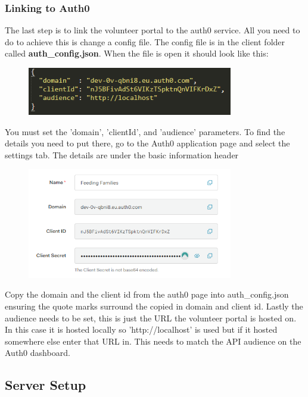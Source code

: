 \documentclass[12pt]{article}
\begin{document}
\subsubsection{Linking to Auth0}
The last step is to link the volunteer portal to the auth0 service. All you need to do to achieve this is change a config file. The config file is in the client folder called \textbf{auth\_config.json}. When the file is open it should look like this: 
\begin{figure}[H]
    \centering
    \includegraphics[width=0.8\textwidth]{auth0/config.png}
\end{figure}
\noindent
You must set the 'domain', 'clientId', and 'audience' parameters. To find the details you need to put there, go to the Auth0 application page and select the settings tab. The details are under the basic information header
\begin{figure}[H]
    \centering
    \includegraphics[width=0.8\textwidth]{auth0/configsettings.png}
\end{figure}
\noindent
Copy the domain and the client id from the auth0 page into auth\_config.json ensuring the quote marks surround the copied in domain and client id. Lastly the audience needs to be set, this is just the URL the volunteer portal is hosted on. In this case it is hosted locally so 'http://localhost' is used but if it hosted somewhere else enter that URL in. This needs to match the API audience on the Auth0 dashboard.


\newpage
\subsection{Server Setup}
\end{document}
